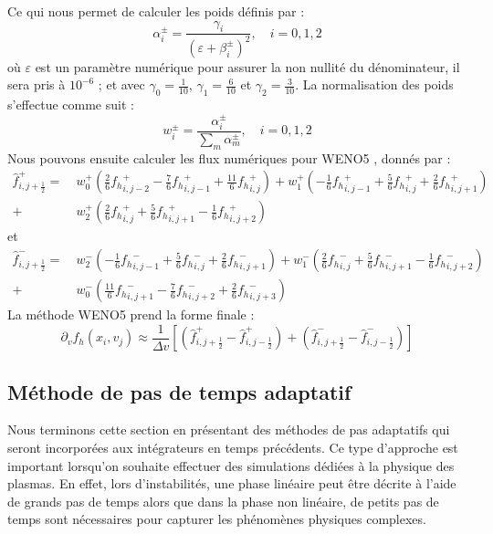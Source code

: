 Ce qui nous permet de calculer les poids définis par :
$$
  \alpha_i^\pm = \frac{\gamma_i}{(\varepsilon + \beta_i^\pm)^2},\quad i=0,1,2
$$
où $\varepsilon$ est un paramètre numérique pour assurer la non nullité du dénominateur, il sera pris à $10^{-6}$ ; et avec $\gamma_0=\frac{1}{10}$, $\gamma_1=\frac{6}{10}$ et $\gamma_2=\frac{3}{10}$. La normalisation des poids s'effectue comme suit :
$$
  w_i^\pm = \frac{\alpha_i^\pm}{\sum_m \alpha_m^\pm},\quad i=0,1,2
$$
Nous pouvons ensuite calculer les flux numériques pour WENO5 \cite{Shu:2003}, donnés par :
$$
  \begin{aligned}
    \hat{f}_{i,j+\frac{1}{2}}^+   =\ & w_0^+\left(  \frac{2}{6}\left.f_h\right.^+_{i,j-2} - \frac{7}{6}\left.f_h\right.^+_{i,j-1} + \frac{11}{6}\left.f_h\right.^+_{i,j}   \right)
                                  +    w_1^+\left( -\frac{1}{6}\left.f_h\right.^+_{i,j-1} + \frac{5}{6}\left.f_h\right.^+_{i,j}   +  \frac{2}{6}\left.f_h\right.^+_{i,j+1} \right) \\
                                  +  & w_2^+\left(  \frac{2}{6}\left.f_h\right.^+_{i,j}   + \frac{5}{6}\left.f_h\right.^+_{i,j+1} -  \frac{1}{6}\left.f_h\right.^+_{i,j+2} \right)
  \end{aligned}
$$
et
$$
  \begin{aligned}
    \hat{f}_{i,j+\frac{1}{2}}^-   =\ & w_2^-\left( -\frac{1}{6}\left.f_h\right.^-_{i,j-1} + \frac{5}{6}\left.f_h\right.^-_{i,j}   + \frac{2}{6}\left.f_h\right.^-_{i,j+1} \right)
                                  +    w_1^-\left(  \frac{2}{6}\left.f_h\right.^-_{i,j}   + \frac{5}{6}\left.f_h\right.^-_{i,j+1} - \frac{1}{6}\left.f_h\right.^-_{i,j+2} \right) \\
                                  +  & w_0^-\left( \frac{11}{6}\left.f_h\right.^-_{i,j+1} - \frac{7}{6}\left.f_h\right.^-_{i,j+2} + \frac{2}{6}\left.f_h\right.^-_{i,j+3} \right)
  \end{aligned}
$$
La méthode WENO5 prend la forme finale :
$$
  \partial_vf_h(x_i,v_j) \approx \frac{1}{\Delta v}\left[ \left(\hat{f}_{i,j+\frac{1}{2}}^+ - \hat{f}_{i,j-\frac{1}{2}}^+ \right) + \left(\hat{f}_{i,j+\frac{1}{2}}^- - \hat{f}_{i,j-\frac{1}{2}}^- \right) \right]
$$

\subsection{Méthode de pas de temps adaptatif}\label{ssec:dtadapt}

Nous terminons cette section en présentant des méthodes de pas adaptatifs qui seront incorporées aux intégrateurs en temps précédents. Ce type d'approche est important lorsqu'on souhaite effectuer des simulations dédiées à la physique des plasmas. En effet, lors d'instabilités, une phase linéaire peut être décrite à l'aide de grands pas de temps alors que dans la phase non linéaire, de petits pas de temps sont nécessaires pour capturer les phénomènes physiques complexes. 

